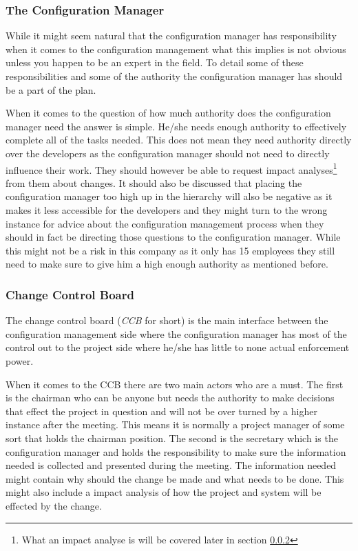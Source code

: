 \documentclass[a4paper]{article}
\begin{document}
\subsubsection{The Configuration Manager}
While it might seem natural that the configuration manager has responsibility when it comes to the configuration management what this implies is not obvious unless you happen to be an expert in the field. To detail some of these responsibilities and some of the authority the configuration manager has should be a part of the plan.

When it comes to the question of how much authority does the configuration manager need the answer is simple. He/she needs enough authority to effectively complete all of the tasks needed. This does not mean they need authority directly over the developers as the configuration manager should not need to directly influence their work. They should however be able to request impact analyses\footnote{What an impact analyse is will be covered later in section \ref{CCB}} from them about changes. It should also be discussed that placing the configuration manager too high up in the hierarchy will also be negative as it makes it less accessible for the developers and they might turn to the wrong instance for advice about the configuration management process when they should in fact be directing those questions to the configuration manager.\cite{daniels} While this might not be a risk in this company as it only has 15 employees they still need to make sure to give him a high enough authority as mentioned before.

\subsubsection{Change Control Board}\label{CCB}
The change control board (\emph{CCB} for short) is the main interface between the configuration management side where the configuration manager has most of the control out to the project side where he/she has little to none actual enforcement power. 

When it comes to the CCB there are two main actors who are a must. The first is the chairman who can be anyone but needs the authority to make decisions that effect the project in question and will not be over turned by a higher instance after the meeting. This means it is normally a project manager of some sort that holds the chairman position. The second is the secretary which is the configuration manager and holds the responsibility to make sure the information needed is collected and presented during the meeting. The information needed might contain why should the change be made and what needs to be done. This might also include a impact analysis of how the project and system will be effected by the change.\cite{daniels}
\end{document}
